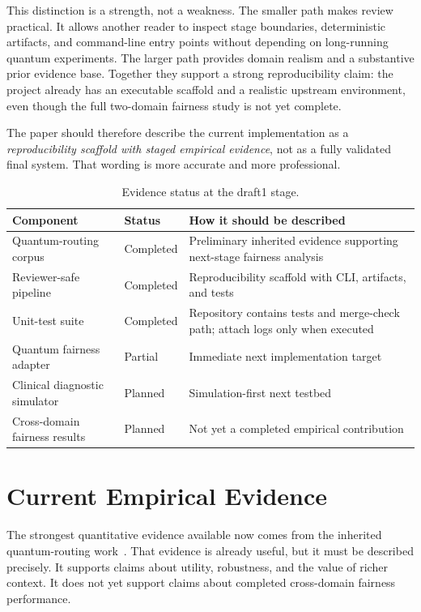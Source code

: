 \documentclass[conference]{IEEEtran}
\begin{document}
This distinction is a strength, not a weakness. The smaller path makes review practical. It allows another reader to inspect stage boundaries, deterministic artifacts, and command-line entry points without depending on long-running quantum experiments. The larger path provides domain realism and a substantive prior evidence base. Together they support a strong reproducibility claim: the project already has an executable scaffold and a realistic upstream environment, even though the full two-domain fairness study is not yet complete.

The paper should therefore describe the current implementation as a \emph{reproducibility scaffold with staged empirical evidence}, not as a fully validated final system. That wording is more accurate and more professional.

\begin{table}[t]
\caption{Evidence status at the draft1 stage.}
\label{tab:evidence_status}
\centering
\small
\begin{tabular}{p{}p{}p{}}
\toprule
\textbf{Component} & \textbf{Status} & \textbf{How it should be described} \\
\midrule
Quantum-routing corpus & Completed & Preliminary inherited evidence supporting next-stage fairness analysis \\
Reviewer-safe pipeline & Completed & Reproducibility scaffold with CLI, artifacts, and tests \\
Unit-test suite & Completed & Repository contains tests and merge-check path; attach logs only when executed \\
Quantum fairness adapter & Partial & Immediate next implementation target \\
Clinical diagnostic simulator & Planned & Simulation-first next testbed \\
Cross-domain fairness results & Planned & Not yet a completed empirical contribution \\
\bottomrule
\end{tabular}
\end{table}

\section{Current Empirical Evidence}
The strongest quantitative evidence available now comes from the inherited quantum-routing work~\cite{garcia2026threat_aware_quantum_routing}. That evidence is already useful, but it must be described precisely. It supports claims about utility, robustness, and the value of richer context. It does not yet support claims about completed cross-domain fairness performance.
\end{document}
